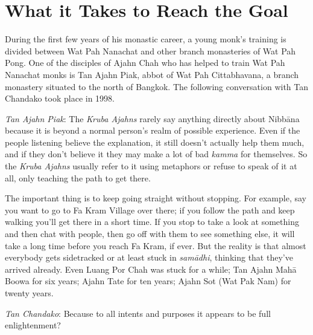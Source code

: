 

\chapter{What it Takes to Reach the Goal}
\markright{\chapterAuthor}

During the first few years of his monastic career, a young monk's
training is divided between Wat Pah Nanachat and other branch
monasteries of Wat Pah Pong. One of the disciples of Ajahn Chah who has
helped to train Wat Pah Nanachat monks is Tan Ajahn Piak, abbot of Wat
Pah Cittabhavana, a branch monastery situated to the north of Bangkok.
The following conversation with Tan Chandako took place in 1998.

\emph{Tan Ajahn Piak}: The \emph{Kruba Ajahns  } rarely say anything
directly about Nibbāna because it is beyond a normal person's realm of
possible experience. Even if the people listening believe the
explanation, it still doesn't actually help them much, and if they don't
believe it they may make a lot of bad \emph{kamma} for themselves. So
the \emph{Kruba Ajahns  } usually refer to it using metaphors or refuse
to speak of it at all, only teaching the path to get there.

The important thing is to keep going straight without stopping. For
example, say you want to go to Fa Kram Village over there; if you follow
the path and keep walking you'll get there in a short time. If you stop
to take a look at something and then chat with people, then go off with
them to see something else, it will take a long time before you reach Fa
Kram, if ever. But the reality is that almost everybody gets sidetracked
or at least stuck in \emph{samādhi}, thinking that they've arrived
already. Even Luang Por Chah was stuck for a while; Tan Ajahn Mahā Boowa
for six years; Ajahn Tate for ten years; Ajahn Sot (Wat Pak Nam) for
twenty years.

\emph{Tan Chandako}: Because to all intents and purposes it appears to
be full enlightenment?

